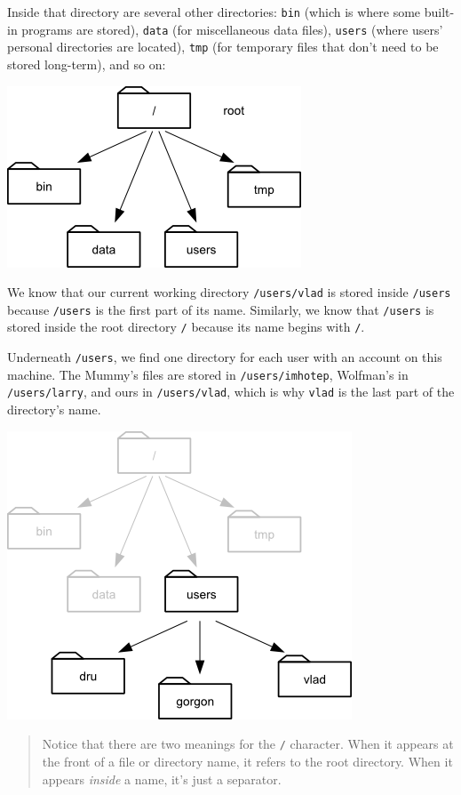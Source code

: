 \documentclass[]{book}
\begin{document}
Inside that directory are several other directories: \texttt{bin} (which
is where some built-in programs are stored), \texttt{data} (for
miscellaneous data files), \texttt{users} (where users' personal
directories are located), \texttt{tmp} (for temporary files that don't
need to be stored long-term), and so on:

\includegraphics{novice/shell/img/filesystem.png}

We know that our current working directory \texttt{/users/vlad} is
stored inside \texttt{/users} because \texttt{/users} is the first part
of its name. Similarly, we know that \texttt{/users} is stored inside
the root directory \texttt{/} because its name begins with \texttt{/}.

Underneath \texttt{/users}, we find one directory for each user with an
account on this machine. The Mummy's files are stored in
\texttt{/users/imhotep}, Wolfman's in \texttt{/users/larry}, and ours in
\texttt{/users/vlad}, which is why \texttt{vlad} is the last part of the
directory's name.

\includegraphics{novice/shell/img/home-directories.png}

\begin{quote}
Notice that there are two meanings for the \texttt{/} character. When it
appears at the front of a file or directory name, it refers to the root
directory. When it appears \emph{inside} a name, it's just a separator.
\end{quote}
\end{document}
